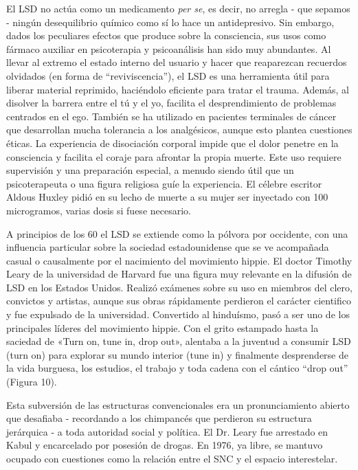 El LSD no actúa como un medicamento \textit{per se}, es decir, no arregla - que sepamos - ningún desequilibrio químico como sí lo hace un antidepresivo. Sin embargo, dados los peculiares efectos que produce sobre la consciencia, sus usos como fármaco auxiliar en psicoterapia y psicoanálisis han sido muy abundantes. Al llevar al extremo el estado interno del usuario y hacer que reaparezcan recuerdos olvidados (en forma de \enquote{reviviscencia}), el LSD es una herramienta útil para liberar material reprimido, haciéndolo eficiente para tratar el trauma. Además, al disolver la barrera entre el tú y el yo, facilita el desprendimiento de problemas centrados en el ego. También se ha utilizado en pacientes terminales de cáncer que desarrollan mucha tolerancia a los analgésicos, aunque esto plantea cuestiones éticas. La experiencia de disociación corporal impide que el dolor penetre en la consciencia y facilita el coraje para afrontar la propia muerte. Este uso requiere supervisión y una preparación especial, a menudo siendo útil que un psicoterapeuta o una figura religiosa guíe la experiencia. El célebre escritor Aldous Huxley pidió en su lecho de muerte a su mujer ser inyectado con 100 microgramos, varias dosis si fuese necesario.

A principios de los 60 el LSD se extiende como la pólvora por occidente, con una influencia particular sobre la sociedad estadounidense que se ve acompañada casual o causalmente por el nacimiento del movimiento hippie. El doctor Timothy Leary de la universidad de Harvard fue una figura muy relevante en la difusión de LSD en los Estados Unidos. Realizó exámenes sobre su uso en miembros del clero, convictos y artistas, aunque sus obras rápidamente perdieron el carácter cientifico y fue expulsado de la universidad. Convertido al hinduísmo, pasó a ser uno de los principales líderes del movimiento hippie. Con el grito estampado hasta la saciedad de «Turn on, tune in, drop out», alentaba a la juventud a consumir LSD (turn on) para explorar su mundo interior (tune in) y finalmente desprenderse de la vida burguesa, los estudios, el trabajo y toda cadena con el cántico \enquote{drop out} (Figura 10).


Esta subversión de las estructuras convencionales era un pronunciamiento abierto que desafiaba - recordando a los chimpancés que perdieron su estructura jerárquica - a toda autoridad social y política. El Dr. Leary fue arrestado en Kabul y encarcelado por posesión de drogas. En 1976, ya libre, se mantuvo ocupado con cuestiones como la relación entre el SNC y el espacio interestelar.

